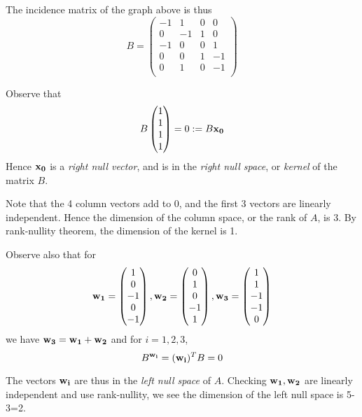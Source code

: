 \documentclass[11pt]{article}
\begin{document}
The incidence matrix of the graph above is thus
\[B=\begin{pmatrix}
  -1 & 1 & 0 & 0 \\
  0 & -1 & 1 & 0 \\
  -1 & 0 & 0 & 1 \\
  0 & 0 & 1 & -1 \\
  0 & 1 & 0 & -1 \\
\end{pmatrix}\]

Observe that 
\[B\begin{pmatrix}1\\1\\1\\1\end{pmatrix}=0:=B\bf{x_0}\]
Hence \(\bf{x_0}\) is a \emph{right null vector}, and is in the \emph{right null space}, or \emph{kernel} of the matrix \(B\). 

Note that the 4 column vectors add to 0, and the first 3 vectors are linearly independent. Hence the dimension of the column space, or the rank of \(A\), is 3. By rank-nullity theorem, the dimension of the kernel is 1.

\vspace{5pt}Observe also that for
\[\bf{w_1}=\begin{pmatrix}1\\0\\-1\\0\\-1\end{pmatrix},\bf{w_2}=\begin{pmatrix}0\\1\\0\\-1\\1\end{pmatrix},\bf{w_3}=\begin{pmatrix}1\\1\\-1\\-1\\0\end{pmatrix}\]
we have \(\bf{w_3}=\bf{w_1}+\bf{w_2}\) and for \(i=1,2,3\),
\[B^\bf{w_i}=(\bf{w_i})^TB=0\]

The vectors \(\bf{w_i}\) are thus in the \emph{left null space} of \(A\). Checking \(\bf{w_1},\bf{w_2}\) are linearly independent and use rank-nullity, we see the dimension of the left null space is 5-3=2.
\end{document}
